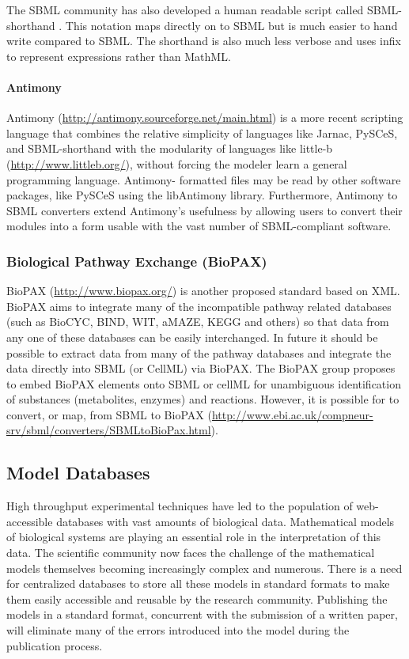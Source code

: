 The SBML community has also developed a human readable script called
SBML- shorthand \autocite{gillespie2006tools}. This notation maps
directly on to SBML but is much easier to hand write compared to SBML.
The shorthand is also much less verbose and uses infix to represent
expressions rather than MathML.

\paragraph{Antimony}

Antimony (\url{http://antimony.sourceforge.net/main.html})
\autocite{smith2009antimony} is a more recent scripting language that
combines the relative simplicity of languages like Jarnac, PySCeS, and
SBML-shorthand with the modularity of languages like little-b
(\url{http://www.littleb.org/}), without forcing the modeler learn a
general programming language. Antimony- formatted files may be read by
other software packages, like PySCeS using the libAntimony library.
Furthermore, Antimony to SBML converters extend Antimony's usefulness by
allowing users to convert their modules into a form usable with the vast
number of SBML-compliant software.

\subsubsection{Biological Pathway Exchange (BioPAX)}

BioPAX (\url{http://www.biopax.org/}) \autocite{demir2010biopax}
\autocite{stromback2005representations} is another proposed standard
based on XML. BioPAX aims to integrate many of the incompatible pathway
related databases (such as BioCYC, BIND, WIT, aMAZE, KEGG and others) so
that data from any one of these databases can be easily interchanged. In
future it should be possible to extract data from many of the pathway
databases and integrate the data directly into SBML (or CellML) via
BioPAX. The BioPAX group proposes to embed BioPAX elements onto SBML or
cellML for unambiguous identification of substances (metabolites,
enzymes) and reactions. However, it is possible for to convert, or map,
from SBML to BioPAX
(\url{http://www.ebi.ac.uk/compneur-srv/sbml/converters/SBMLtoBioPax.html}).

\subsection{Model Databases}

High throughput experimental techniques have led to the population of
web- accessible databases with vast amounts of biological data.
Mathematical models of biological systems are playing an essential role
in the interpretation of this data. The scientific community now faces
the challenge of the mathematical models themselves becoming
increasingly complex and numerous. There is a need for centralized
databases to store all these models in standard formats to make them
easily accessible and reusable by the research community. Publishing the
models in a standard format, concurrent with the submission of a written
paper, will eliminate many of the errors introduced into the model
during the publication process.

